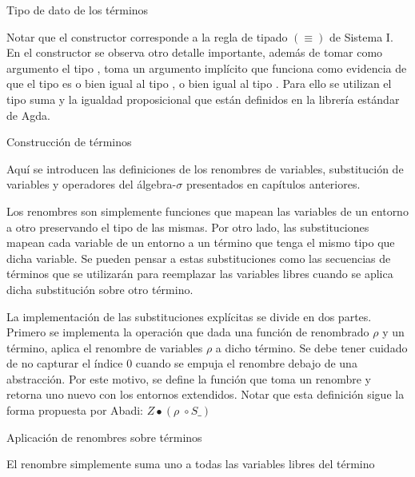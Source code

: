 \begin{codigo}
	Tipo de dato de los términos
	
\end{codigo}

Notar que el constructor \const{$[\_]\equiv\_$} corresponde a la regla de tipado $(\equiv)$ de Sistema I.
En el constructor \const{$\pi$} se observa otro detalle importante, además de tomar como argumento el tipo , toma un argumento implícito que funciona como evidencia de que el tipo  es o bien igual al tipo , o bien igual al tipo .
Para ello se utilizan el tipo suma \type{$\_\uplus\_$} y la igualdad proposicional \type{$\_\cong\_$} que están definidos en la librería estándar de Agda.

\begin{example}
	Construcción de términos
\end{example}

Aquí se introducen las definiciones de los renombres de variables, substitución de variables y operadores del álgebra-$\sigma$ presentados en capítulos anteriores.


Los renombres son simplemente funciones que mapean las variables de un entorno a otro preservando el tipo de las mismas.
Por otro lado, las substituciones mapean cada variable de un entorno a un término que tenga el mismo tipo que dicha variable.
Se pueden pensar a estas substituciones como las secuencias de términos que se utilizarán para reemplazar las variables libres cuando se aplica dicha substitución sobre otro término. 

La implementación de las substituciones explícitas se divide en dos partes.
Primero se implementa la operación  que dada una función de renombrado $\rho$ y un término, aplica el renombre de variables $\rho$ a dicho término.
Se debe tener cuidado de no capturar el índice 0 cuando se empuja el renombre debajo de una abstracción.
Por este motivo, se define la función  que toma un renombre y retorna uno nuevo con los entornos extendidos.
Notar que esta definición sigue la forma propuesta por Abadi: $Z \bullet (\rho \; \circ S\_)$

\begin{codigo}
	Aplicación de renombres sobre términos
\end{codigo}

\begin{example}
	El renombre  simplemente suma uno a todas las variables libres del término
\end{example}

